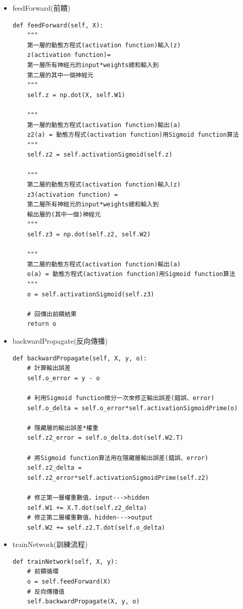 \documentclass[12pt, a4paper]{article}
\begin{document}
\begin{itemize}
\item feedForward(前饋)\\
\begin{lstlisting}
def feedForward(self, X):
    """
    第一層的動態方程式(activation function)輸入(z)
    z(activation function)= 
    第一層所有神經元的input*weights總和輸入到
    第二層的其中一個神經元
    """
    self.z = np.dot(X, self.W1)
	
    """
    第一層的動態方程式(activation function)輸出(a)
    z2(a) = 動態方程式(activation function)用Sigmoid function算法
    """
    self.z2 = self.activationSigmoid(self.z)

    """
    第二層的動態方程式(activation function)輸入(z)
    z3(activation function) = 
    第二層所有神經元的input*weights總和輸入到
    輸出層的(其中一個)神經元
    """
    self.z3 = np.dot(self.z2, self.W2)
	
    """
    第二層的動態方程式(activation function)輸出(a)
    o(a) = 動態方程式(activation function)用Sigmoid function算法
    """
    o = self.activationSigmoid(self.z3)

    # 回傳出前饋結果
    return o
\end{lstlisting}

\end{itemize}
\begin{itemize}
\item backwardPropagate(反向傳播)\\
\begin{lstlisting}
def backwardPropagate(self, X, y, o):
    # 計算輸出誤差
    self.o_error = y - o

    # 利用Sigmoid function微分一次來修正輸出誤差(錯誤、error)
    self.o_delta = self.o_error*self.activationSigmoidPrime(o)

    # 隱藏層的輸出誤差*權重
    self.z2_error = self.o_delta.dot(self.W2.T)

    # 將Sigmoid function算法用在隱藏層輸出誤差(錯誤、error)
    self.z2_delta = 
    self.z2_error*self.activationSigmoidPrime(self.z2)

    # 修正第一層權重數值，input--->hidden
    self.W1 += X.T.dot(self.z2_delta)
    # 修正第二層權重數值，hidden--->output
    self.W2 += self.z2.T.dot(self.o_delta)
\end{lstlisting}
\end{itemize}

\begin{itemize}
\item trainNetwork(訓練流程)\\
\begin{lstlisting}
def trainNetwork(self, X, y):
    # 前饋循環 
    o = self.feedForward(X)
    # 反向傳播值
    self.backwardPropagate(X, y, o)
\end{lstlisting}
\end{itemize}
\end{document}
